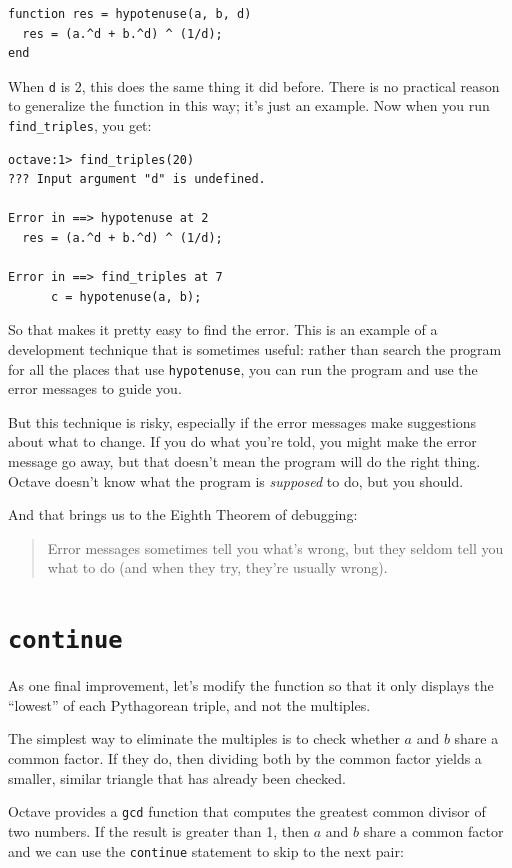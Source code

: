 \documentclass{book}
\begin{document}
\begin{verbatim}
function res = hypotenuse(a, b, d)
  res = (a.^d + b.^d) ^ (1/d);
end
\end{verbatim}

When {\tt d} is 2, this does the same thing it did before. There is
no practical reason to generalize the function in this way; it's just
an example. Now when you run {\tt find\_triples}, you get:

\begin{verbatim}
octave:1> find_triples(20)
??? Input argument "d" is undefined.

Error in ==> hypotenuse at 2
  res = (a.^d + b.^d) ^ (1/d);

Error in ==> find_triples at 7
      c = hypotenuse(a, b);
\end{verbatim}

So that makes it pretty easy to find the error. This is an example of
a development technique that is sometimes useful: rather
than search the program for all the places that use {\tt hypotenuse},
you can run the program and use the error messages to guide you.

But this technique is risky, especially if the error messages make
suggestions about what to change. If you do what you're told, you
might make the error message go away, but that doesn't mean the
program will do the right thing. Octave doesn't know what the program
is {\em supposed} to do, but you should.

And that brings us to the Eighth Theorem of debugging:

\begin{quote}
Error messages sometimes tell you what's wrong, but they
seldom tell you what to do (and when they try, they're usually
wrong).
\end{quote}


\section{{\tt continue}}

As one final improvement, let's modify the function so that it only
displays the ``lowest'' of each Pythagorean triple, and not the
multiples.

The simplest way to eliminate the multiples is to check whether
$a$ and $b$ share a common factor. If they do, then dividing both
by the common factor yields a smaller, similar triangle that has
already been checked.

Octave provides a {\tt gcd} function that computes the greatest common
divisor of two numbers. If the result is greater than 1, then
$a$ and $b$ share a common factor and we can use the {\tt continue}
statement to skip to the next pair:
\end{document}
